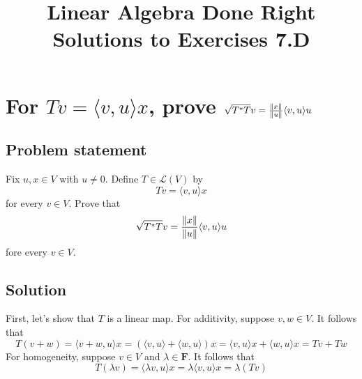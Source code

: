 \documentclass{article}
\title{Linear Algebra Done Right\\Solutions to Exercises 7.D}
\author{}
\date{}
\begin{document}
\maketitle

\section{For $Tv=\langle v,u\rangle x$, prove $\sqrt{T^*T}v=\frac{\lVert x\rVert}{\lVert u\rVert}\langle v,u\rangle u$}
\subsection*{Problem statement}
Fix $u,x\in V$ with $u\neq 0$. Define $T\in\mathcal{L}(V)$ by
\[Tv=\langle v,u\rangle x\]
for every $v\in V$. Prove that
\[\sqrt{T^*T}v=\frac{\lVert x\rVert}{\lVert u\rVert}\langle v,u\rangle u\]
fore every $v\in V$.

\subsection*{Solution}
First, let's show that $T$ is a linear map. For additivity, suppose $v,w\in V$. It follows that
\[T(v+w)=\langle v+w,u\rangle x=(\langle v,u\rangle+\langle w,u\rangle) x=\langle v,u\rangle x+\langle w,u\rangle x=Tv+Tw\]
For homogeneity, suppose $v\in V$ and $\lambda\in \mathbf{F}$. It follows that
\[T(\lambda v)=\langle \lambda v,u\rangle x=\lambda\langle v,u\rangle x=\lambda (Tv)\]
\end{document}
